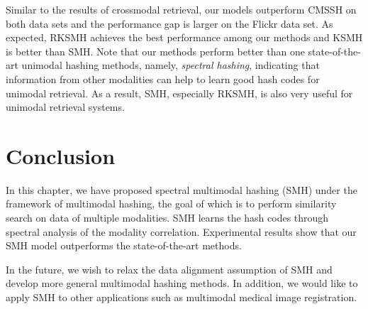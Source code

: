 Similar to the results of crossmodal retrieval, our models outperform \mbox{CMSSH} on both data sets and the performance gap is larger on the \mbox{Flickr} data set. As expected, \mbox{RKSMH} achieves the best performance among our methods and \mbox{KSMH} is better than \mbox{SMH}. Note that our methods perform better than one state-of-the-art unimodal hashing methods, namely, \textit{spectral hashing}, indicating that information from other modalities can help to learn good hash codes for unimodal retrieval. As a result, \mbox{SMH}, especially \mbox{RKSMH}, is also very useful for unimodal retrieval systems.

\section{Conclusion}
\label{smh:conclusion}

In this chapter, we have proposed spectral multimodal hashing (\mbox{SMH}) under the framework of multimodal hashing, the goal of which is to perform similarity search on data of multiple modalities. \mbox{SMH} learns the hash codes through spectral analysis of the modality correlation. Experimental results show that our \mbox{SMH} model outperforms the state-of-the-art methods. %

In the future, we wish to relax the data alignment assumption of SMH and develop more general multimodal hashing methods. In addition, we would like to apply SMH to other applications such as multimodal medical image registration.%

